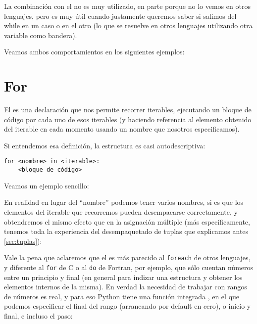 La combinación  con el  no es muy utilizado, en parte porque no lo vemos en otros lenguajes, pero es muy útil cuando justamente queremos saber si salimos del while en un caso o en el otro (lo que se resuelve en otros lenguajes utilizando otra variable como bandera).

Veamos ambos comportamientos en los siguientes ejemplos:



\section{For}\label{sec:for}

El  es una declaración que nos permite recorrer iterables, ejecutando un bloque de código por cada uno de esos iterables (y haciendo referencia al elemento obtenido del iterable en cada momento usando un nombre que nosotros especificamos).

Si entendemos esa definición, la estructura es casi autodescriptiva:

\begin{verbatim}
for <nombre> in <iterable>:
    <bloque de código>
\end{verbatim}

Veamos un ejemplo sencillo:


En realidad en lugar del ``nombre'' podemos tener varios nombres, si es que los elementos del iterable que recorremos pueden desempacarse correctamente, y obtendremos el mismo efecto que en la asignación múltiple (más específicamente, tenemos toda la experiencia del desempaquetado de tuplas que explicamos antes \ref{sec:tuplas}):


Vale la pena que aclaremos que el  es más parecido al \texttt{foreach} de otros lenguajes, y diferente al \texttt{for} de C o al \texttt{do} de Fortran, por ejemplo, que sólo cuentan números entre un principio y final (en general para indizar una estructura y obtener los elementos internos de la misma). En verdad la necesidad de trabajar con rangos de números es real, y para eso Python tiene una función integrada , en el que podemos especificar el final del rango (arrancando por default en cero), o inicio y final, e incluso el paso:

